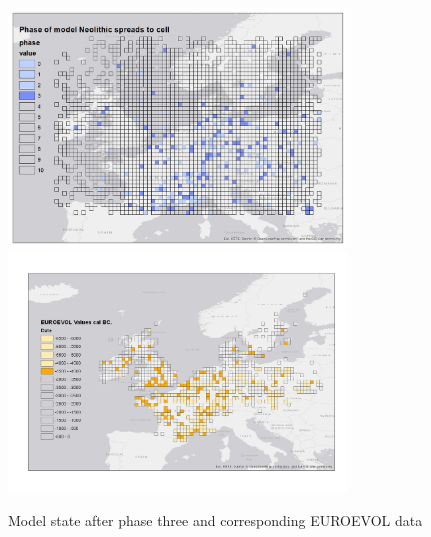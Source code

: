 \begin{figure}
\centering
	\includegraphics[width=0.8\textwidth]{figures/model-3}
	\includegraphics[width=0.8\textwidth]{figures/euroevol-3}
  \caption{Model state after phase three and corresponding EUROEVOL data}
  \label{fig:compare3}
\end{figure}


